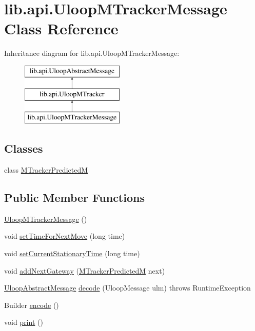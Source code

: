 \hypertarget{classlib_1_1api_1_1UloopMTrackerMessage}{\section{lib.\+api.\+Uloop\+M\+Tracker\+Message Class Reference}
\label{classlib_1_1api_1_1UloopMTrackerMessage}
}
Inheritance diagram for lib.\+api.\+Uloop\+M\+Tracker\+Message\+:\begin{figure}[H]
\begin{center}
\leavevmode
\includegraphics[height=3.000000cm]{classlib_1_1api_1_1UloopMTrackerMessage}
\end{center}
\end{figure}
\subsection*{Classes}
\begin{DoxyCompactItemize}
\item 
class \hyperlink{classlib_1_1api_1_1UloopMTrackerMessage_1_1MTrackerPredictedM}{M\+Tracker\+Predicted\+M}
\end{DoxyCompactItemize}
\subsection*{Public Member Functions}
\begin{DoxyCompactItemize}
\item 
\hyperlink{classlib_1_1api_1_1UloopMTrackerMessage_af2ffccec9a97a071632d90567b5af784}{Uloop\+M\+Tracker\+Message} ()
\item 
void \hyperlink{classlib_1_1api_1_1UloopMTrackerMessage_acae9940756ba963f4c9a703baf738710}{set\+Time\+For\+Next\+Move} (long time)
\item 
void \hyperlink{classlib_1_1api_1_1UloopMTrackerMessage_a2e3de78be834a4e61d5b0f1a3e37eb8d}{set\+Current\+Stationary\+Time} (long time)
\item 
void \hyperlink{classlib_1_1api_1_1UloopMTrackerMessage_a107cb0a2253da877df8d55c2c77c7350}{add\+Next\+Gateway} (\hyperlink{classlib_1_1api_1_1UloopMTrackerMessage_1_1MTrackerPredictedM}{M\+Tracker\+Predicted\+M} next)
\item 
\hyperlink{interfacelib_1_1api_1_1UloopAbstractMessage}{Uloop\+Abstract\+Message} \hyperlink{classlib_1_1api_1_1UloopMTrackerMessage_a3251cbbabd745f22290f334c475d4c97}{decode} (Uloop\+Message ulm)  throws Runtime\+Exception 
\item 
Builder \hyperlink{classlib_1_1api_1_1UloopMTrackerMessage_a9d9ff3e73a53ae13088b52df395de90a}{encode} ()
\item 
void \hyperlink{classlib_1_1api_1_1UloopMTrackerMessage_ad8747254f5616590148266b72b088421}{print} ()
\end{DoxyCompactItemize}
